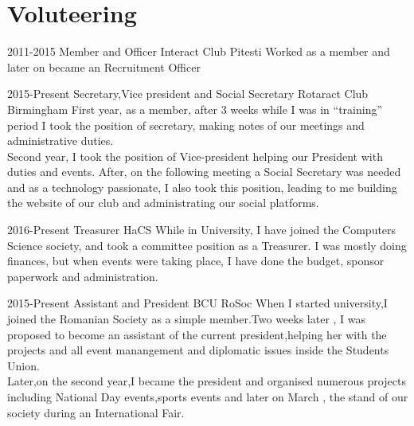 \documentclass[]{friggeri-cv}
\begin{document}
\section{Voluteering}
\begin{entrylist}
    \entry
    {2011-2015}
    {Member and Officer}
    {Interact Club Pitesti}
    {Worked as a member and later on became an Recruitment Officer}
    ~
    
    \entry
    {2015-Present}
    {Secretary,Vice president and Social Secretary}
    {Rotaract Club Birmingham}
    {First year, as a member, after 3 weeks while I was in “training” period I took the position of secretary, making notes of our meetings and administrative duties. \\Second year, I took the position of Vice-president helping our President with duties and events. After, on the following meeting a Social Secretary was needed and as a technology passionate, I also took this position, leading to me building the website of our club and administrating our social platforms.}
    ~
    
    \entry
    {2016-Present}
    {Treasurer}
    {HaCS}
    {While in University, I have joined the Computers Science society, and took a committee position as a Treasurer. I was mostly doing finances, but when events were taking place, I have done the budget, sponsor paperwork and administration.}
    ~ 
    
    \entry
    {2015-Present}
    {Assistant and President}
    {BCU RoSoc}
    {When I started university,I joined the Romanian Society as a simple member.Two weeks later , I was proposed to become an assistant of the current president,helping her with the projects and all event manangement and diplomatic issues inside the Students Union.
    \\Later,on the second year,I became the president and organised numerous projects including National Day events,sports events and later on March , the stand of our society during an International Fair.}
    
\end{entrylist}
\end{document}
